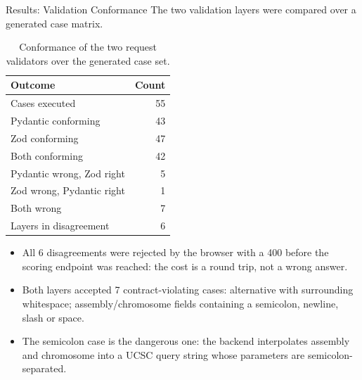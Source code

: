 \documentclass[aspectratio=169,10pt]{beamer}
\begin{document}
\begin{frame}{Results: Validation Conformance}
The two validation layers were compared over a generated case matrix.
\begin{table}
\caption{Conformance of the two request validators over the generated case set.}
\label{tab:validation}
\centering
\footnotesize
\begin{tabular}{@{}lr@{}}
\toprule
Outcome & Count \\
\midrule
Cases executed & 55 \\
Pydantic conforming & 43 \\
Zod conforming & 47 \\
Both conforming & 42 \\
Pydantic wrong, Zod right & 5 \\
Zod wrong, Pydantic right & 1 \\
Both wrong & 7 \\
\midrule
Layers in disagreement & 6 \\
\bottomrule
\end{tabular}
\end{table}
\begin{itemize}\small
\item All 6 disagreements were rejected by the browser with a 400 before the scoring endpoint was reached: the cost is a round trip, not a wrong answer.
\item Both layers accepted 7 contract-violating cases: alternative with surrounding whitespace; assembly/chromosome fields containing a semicolon, newline, slash or space.
\item The semicolon case is the dangerous one: the backend interpolates assembly and chromosome into a UCSC query string whose parameters are semicolon-separated.
\end{itemize}
\end{frame}
\end{document}

